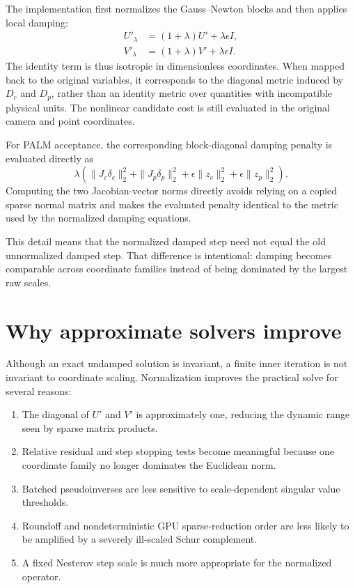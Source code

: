 \documentclass[11pt]{article}
\begin{document}
The implementation first normalizes the Gauss--Newton blocks and then applies
local damping:
\begin{align}
  U'_{\lambda} &= (1+\lambda)U' + \lambda\epsilon I, \\
  V'_{\lambda} &= (1+\lambda)V' + \lambda\epsilon I.
\end{align}
The identity term is thus isotropic in dimensionless coordinates.  When mapped
back to the original variables, it corresponds to the diagonal metric induced
by $D_c$ and $D_p$, rather than an identity metric over quantities with
incompatible physical units.  The nonlinear candidate cost is still evaluated
in the original camera and point coordinates.

For PALM acceptance, the corresponding block-diagonal damping penalty is
evaluated directly as
\begin{equation}
  \lambda\left(
    \|J_c\delta_c\|_2^2 + \|J_p\delta_p\|_2^2
    + \epsilon\|z_c\|_2^2 + \epsilon\|z_p\|_2^2
  \right).
\end{equation}
Computing the two Jacobian-vector norms directly avoids relying on a copied
sparse normal matrix and makes the evaluated penalty identical to the metric
used by the normalized damping equations.

This detail means that the normalized damped step need not equal the old
unnormalized damped step.  That difference is intentional: damping becomes
comparable across coordinate families instead of being dominated by the
largest raw scales.

\section{Why approximate solvers improve}

Although an exact undamped solution is invariant, a finite inner iteration is
not invariant to coordinate scaling.  Normalization improves the practical
solve for several reasons:

\begin{enumerate}
  \item The diagonal of $U'$ and $V'$ is approximately one, reducing the dynamic
        range seen by sparse matrix products.
  \item Relative residual and step stopping tests become meaningful because one
        coordinate family no longer dominates the Euclidean norm.
  \item Batched pseudoinverses are less sensitive to scale-dependent singular
        value thresholds.
  \item Roundoff and nondeterministic GPU sparse-reduction order are less likely
        to be amplified by a severely ill-scaled Schur complement.
  \item A fixed Nesterov step scale is much more appropriate for the normalized
        operator.
\end{enumerate}
\end{document}
